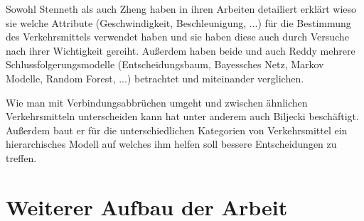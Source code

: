 Sowohl Stenneth als auch Zheng haben in ihren Arbeiten detailiert erklärt wieso sie welche Attribute (Geschwindigkeit, Beschleunigung, ...) für die Bestimmung des Verkehrsmittels verwendet haben und sie haben diese auch durch Versuche nach ihrer Wichtigkeit gereiht. Außerdem haben beide und auch Reddy  mehrere Schlussfolgerungsmodelle (Entscheidungsbaum, Bayessches Netz, Markov Modelle, Random Forest, ...) betrachtet und miteinander verglichen.

Wie man mit Verbindungsabbrüchen umgeht und zwischen ähnlichen Verkehrsmitteln unterscheiden kann hat unter anderem auch Biljecki beschäftigt. Außerdem baut er für die unterschiedlichen Kategorien von Verkehrsmittel ein hierarchisches Modell auf welches ihm helfen soll bessere Entscheidungen zu treffen.

\section{Weiterer Aufbau der Arbeit}
